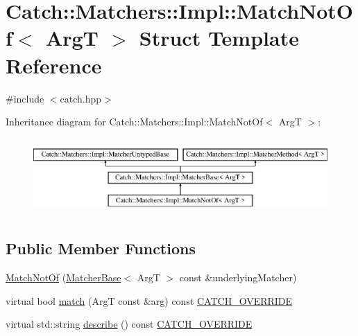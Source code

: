 \hypertarget{struct_catch_1_1_matchers_1_1_impl_1_1_match_not_of}{}\section{Catch\+:\+:Matchers\+:\+:Impl\+:\+:Match\+Not\+Of$<$ ArgT $>$ Struct Template Reference}
\label{struct_catch_1_1_matchers_1_1_impl_1_1_match_not_of}


{\ttfamily \#include $<$catch.\+hpp$>$}

Inheritance diagram for Catch\+:\+:Matchers\+:\+:Impl\+:\+:Match\+Not\+Of$<$ ArgT $>$\+:\begin{figure}[H]
\begin{center}
\leavevmode
\includegraphics[height=2.926829cm]{struct_catch_1_1_matchers_1_1_impl_1_1_match_not_of}
\end{center}
\end{figure}
\subsection*{Public Member Functions}
\begin{DoxyCompactItemize}
\item 
\mbox{\hyperlink{struct_catch_1_1_matchers_1_1_impl_1_1_match_not_of_a47afdd9e4c3354cef85adc3186097ae4}{Match\+Not\+Of}} (\mbox{\hyperlink{struct_catch_1_1_matchers_1_1_impl_1_1_matcher_base}{Matcher\+Base}}$<$ ArgT $>$ const \&underlying\+Matcher)
\item 
virtual bool \mbox{\hyperlink{struct_catch_1_1_matchers_1_1_impl_1_1_match_not_of_a1b9ad6566e4ab0f292d2903f557307cc}{match}} (ArgT const \&arg) const \mbox{\hyperlink{catch_8hpp_a8ecdce4d3f57835f707915ae831eb847}{C\+A\+T\+C\+H\+\_\+\+O\+V\+E\+R\+R\+I\+DE}}
\item 
virtual std\+::string \mbox{\hyperlink{struct_catch_1_1_matchers_1_1_impl_1_1_match_not_of_a62bdc7dcb9ff000438a4ed3d5483a248}{describe}} () const \mbox{\hyperlink{catch_8hpp_a8ecdce4d3f57835f707915ae831eb847}{C\+A\+T\+C\+H\+\_\+\+O\+V\+E\+R\+R\+I\+DE}}
\end{DoxyCompactItemize}

